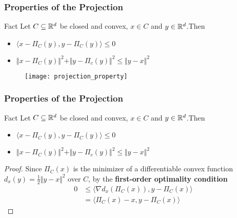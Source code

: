 \documentclass{beamer}
\begin{document}
\begin{frame}
  \frametitle{Properties of the Projection}
  \begin{block}{Fact}
    Let $C\subseteq \mathbb{R}^d$ be closed and convex, $x\in C$ and $y \in \mathbb{R}^d$.Then
    \begin{itemize}
      \item $\langle x- \Pi_C(y), y - \Pi_C(y)  \rangle \le 0$
      \item $\Vert x - \Pi_C(y) \Vert^2 + \Vert y - \Pi_c(y) \Vert^2 \le \Vert y-x \Vert^2$
    \end{itemize}
  \end{block}
  \begin{figure}[ht]
    \centering
    \texttt{[image: projection\_property]}
  \end{figure}

\end{frame}


\begin{frame}
  \frametitle{Properties of the Projection}
  \begin{block}{Fact}
    Let $C\subseteq \mathbb{R}^d$ be closed and convex, $x\in C$ and $y \in \mathbb{R}^d$.Then
    \begin{itemize}
      \item $\langle x- \Pi_C(y), y - \Pi_C(y)  \rangle \le 0$
      \item $\Vert x - \Pi_C(y) \Vert^2 + \Vert y - \Pi_c(y) \Vert^2 \le \Vert y-x \Vert^2$
    \end{itemize}
  \end{block}
  \begin{proof}
    Since $\Pi_C(x)$ is the minimizer of a differentiable convex function $d_x(y) =\frac12 \Vert y-x \Vert^2$ over $C$, by the \textbf{first-order optimality condition}
    \begin{align}
      0 &\le \langle \nabla d_x(\Pi_C(x)), y - \Pi_C(x) \rangle \\
        &= \langle \Pi_C(x) - x, y - \Pi_C(x) \rangle
    \end{align}
  \end{proof}
\end{frame}
\end{document}
